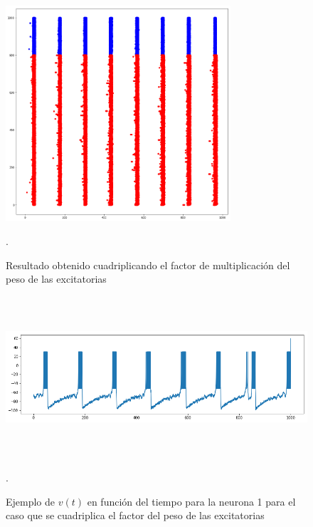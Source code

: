 \documentclass[12pt]{article}
\begin{document}
\begin{figure}[htp!]
    \centering
        \includegraphics[height=8cm]{images/resultadoCuadrupleExitatorias.png}
    \caption[fontsize=2pt]{Resultado obtenido cuadriplicando el factor de multiplicación del peso de las excitatorias}.
\end{figure}

\begin{figure}[htp!]
    \centering
        \includegraphics[height=6cm, width=15cm]{images/ejemploNeuronaCuadrupleExitatoria.png}
    \caption[fontsize=2pt]{Ejemplo de $v(t)$ en función del tiempo para la neurona 1 para el caso que se cuadriplica el factor del peso de las excitatorias}.
\end{figure}

\newpage
\end{document}
